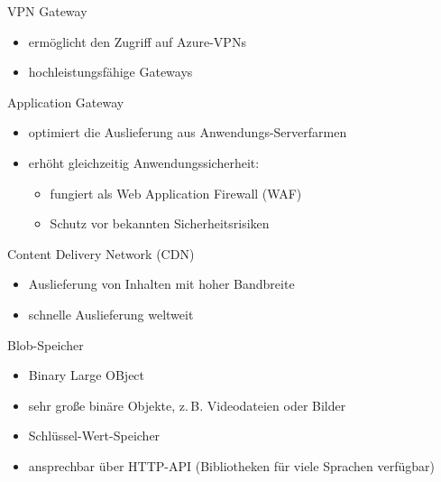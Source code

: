 \begin{flashcard}[Definition]{VPN Gateway}
    \begin{itemize}
        \item ermöglicht den Zugriff auf Azure-VPNs
        \item hochleistungsfähige Gateways
    \end{itemize}

\end{flashcard}

\begin{flashcard}[Definition]{Application Gateway}
    \begin{itemize}
        \item optimiert die Auslieferung aus Anwendungs-Serverfarmen
        \item erhöht gleichzeitig Anwendungssicherheit:
        \begin{itemize}
            \item fungiert als Web Application Firewall (WAF)
            \item[$\Rightarrow$] Schutz vor bekannten Sicherheitsrisiken
        \end{itemize}
    \end{itemize}

\end{flashcard}

\begin{flashcard}[Definition]{Content Delivery Network (CDN)}
    \begin{itemize}
        \item Auslieferung von Inhalten mit hoher Bandbreite
        \item schnelle Auslieferung weltweit
    \end{itemize}
\end{flashcard}

\begin{flashcard}[Definition]{Blob-Speicher}
    \begin{itemize}
        \item Binary Large OBject
        \item sehr große binäre Objekte, z.\,B. Videodateien oder Bilder
        \item Schlüssel-Wert-Speicher
        \item ansprechbar über HTTP-API (Bibliotheken für viele Sprachen verfügbar)
    \end{itemize}

\end{flashcard}

